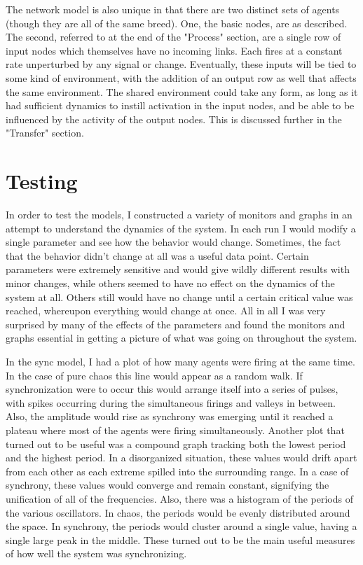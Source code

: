 \documentclass[12pt]{article}
\begin{document}
The network model is also unique in that there are two distinct sets of agents (though they are all of the same breed).  One, the basic nodes, are as described.  The second, referred to at the end of the "Process" section, are a single row of input nodes which themselves have no incoming links.  Each fires at a constant rate unperturbed by any signal or change.  Eventually, these inputs will be tied to some kind of environment, with the addition of an output row as well that affects the same environment.  The shared environment could take any form, as long as it had sufficient dynamics to instill activation in the input nodes, and be able to be influenced by the activity of the output nodes.  This is discussed further in the "Transfer" section.  

\section{Testing}

In order to test the models, I constructed a variety of monitors and graphs in an attempt to understand the dynamics of the system.  In each run I would modify a single parameter and see how the behavior would change.  Sometimes, the fact that the behavior didn't change at all was a useful data point.  Certain parameters were extremely sensitive and would give wildly different results with minor changes, while others seemed to have no effect on the dynamics of the system at all.  Others still would have no change until a certain critical value was reached, whereupon everything would change at once.  All in all I was very surprised by many of the effects of the parameters and found the monitors and graphs essential in getting a picture of what was going on throughout the system.  

In the sync model, I had a plot of how many agents were firing at the same time.  In the case of pure chaos this line would appear as a random walk.  If synchronization were to occur this would arrange itself into a series of pulses, with spikes occurring during the simultaneous firings and valleys in between.  Also, the amplitude would rise as synchrony was emerging until it reached a plateau where most of the agents were firing simultaneously.  Another plot that turned out to be useful was a compound graph tracking both the lowest period and the highest period.  In a disorganized situation, these values would drift apart from each other as each extreme spilled into the surrounding range.  In a case of synchrony, these values would converge and remain constant, signifying the unification of all of the frequencies.  Also, there was a histogram of the periods of the various oscillators.  In chaos, the periods would be evenly distributed around the space.  In synchrony, the periods would cluster around a single value, having a single large peak in the middle.  These turned out to be the main useful measures of how well the system was synchronizing.  
\end{document}
